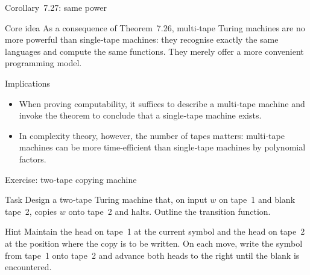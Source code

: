 \begin{frame}[t]{Corollary 7.27: same power}
  \begin{tblock}{Core idea}
    As a consequence of Theorem 7.26, multi‑tape Turing machines are no
    more powerful than single‑tape machines: they recognise exactly the
    same languages and compute the same functions.  They merely offer a
    more convenient programming model.
  \end{tblock}
  \begin{tblock}{Implications}
    \begin{itemize}
      \item When proving computability, it suffices to describe a
        multi‑tape machine and invoke the theorem to conclude that a
        single‑tape machine exists.
      \item In complexity theory, however, the number of tapes matters:
        multi‑tape machines can be more time‑efficient than
        single‑tape machines by polynomial factors.
    \end{itemize}
  \end{tblock}
  \label{fr:7.5-10}
\end{frame}

\begin{frame}[t]{Exercise: two‑tape copying machine}
  \begin{tblock}{Task}
    Design a two‑tape Turing machine that, on input $w$ on tape 1 and
    blank tape 2, copies $w$ onto tape 2 and halts.  Outline the
    transition function.
  \end{tblock}
  \begin{talert}{Hint}
    Maintain the head on tape 1 at the current symbol and the head on
    tape 2 at the position where the copy is to be written.  On each
    move, write the symbol from tape 1 onto tape 2 and advance both
    heads to the right until the blank is encountered.
  \end{talert}
  \label{fr:7.5-11}
\end{frame}

